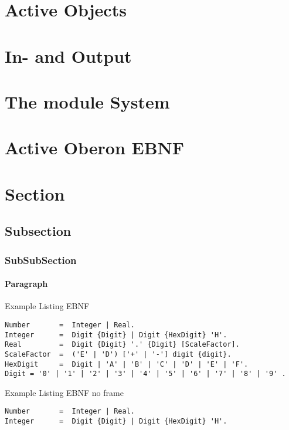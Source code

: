 \documentclass[a4paper,11pt]{article}
\begin{document}
\section{Active Objects}

\section{In- and Output}

\section{The module System}

\section{Active Oberon EBNF}



\section{Section}
\subsection{Subsection}
\subsubsection{SubSubSection}
\paragraph{Paragraph}

Example Listing EBNF
\begin{lstlisting}[language=ebnf]
Number       =  Integer | Real.
Integer      =  Digit {Digit} | Digit {HexDigit} 'H'.
Real         =  Digit {Digit} '.' {Digit} [ScaleFactor].
ScaleFactor  =  ('E' | 'D') ['+' | '-'] digit {digit}.
HexDigit     =  Digit | 'A' | 'B' | 'C' | 'D' | 'E' | 'F'.
Digit = '0' | '1' | '2' | '3' | '4' | '5' | '6' | '7' | '8' | '9' .
\end{lstlisting}

Example Listing EBNF no frame
\begin{lstlisting}[language=ebnf,frame=none]
Number       =  Integer | Real.
Integer      =  Digit {Digit} | Digit {HexDigit} 'H'.
\end{lstlisting}
\end{document}
